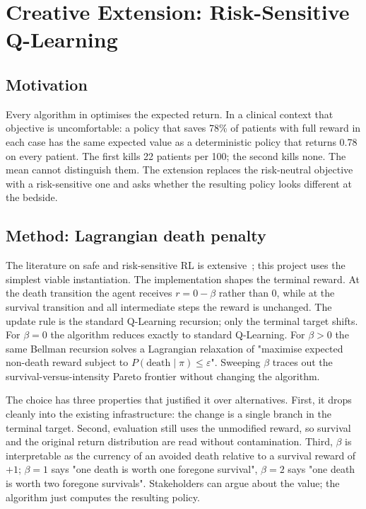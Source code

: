 \section{Creative Extension: Risk-Sensitive Q-Learning}
\label{sec:extension}

\subsection{Motivation}

Every algorithm in  optimises the expected return. In a clinical context that objective is uncomfortable: a policy that saves 78\% of patients with full reward in each case has the same expected value as a deterministic policy that returns 0.78 on every patient. The first kills 22 patients per 100; the second kills none. The mean cannot distinguish them. The extension replaces the risk-neutral objective with a risk-sensitive one and asks whether the resulting policy looks different at the bedside.

\subsection{Method: Lagrangian death penalty}

The literature on safe and risk-sensitive RL is extensive~\citep{garcia2015safe,chow2017cvar}; this project uses the simplest viable instantiation. The implementation shapes the terminal reward. At the death transition the agent receives $r = 0 - \beta$ rather than 0, while at the survival transition and all intermediate steps the reward is unchanged. The update rule is the standard Q-Learning recursion; only the terminal target shifts. For $\beta = 0$ the algorithm reduces exactly to standard Q-Learning. For $\beta > 0$ the same Bellman recursion solves a Lagrangian relaxation of "maximise expected non-death reward subject to $P(\text{death} \mid \pi) \le \varepsilon$". Sweeping $\beta$ traces out the survival-versus-intensity Pareto frontier without changing the algorithm.

The choice has three properties that justified it over alternatives. First, it drops cleanly into the existing infrastructure: the change is a single branch in the terminal target. Second, evaluation still uses the unmodified reward, so survival and the original return distribution are read without contamination. Third, $\beta$ is interpretable as the currency of an avoided death relative to a survival reward of $+1$; $\beta = 1$ says "one death is worth one foregone survival", $\beta = 2$ says "one death is worth two foregone survivals". Stakeholders can argue about the value; the algorithm just computes the resulting policy.

